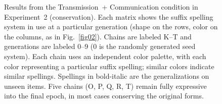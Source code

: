 \documentclass[doc,biblatex]{apa7}
\begin{document}
	\begin{figure}
	\vspace*{2pt}
	\caption{Results from the Transmission~+ Communication condition in Experiment~2 (conservation). Each matrix shows the suffix spelling system in use at a particular generation (shape on the rows, color on the columns, as in Fig.~\ref{fig02}). Chains are labeled K--T and generations are labeled 0--9 (0 is the randomly generated seed system). Each chain uses an independent color palette, with each color representing a particular suffix spelling; similar colors indicate similar spellings. Spellings in bold-italic are the generalizations on unseen items. Five chains (O, P, Q, R, T) remain fully expressive into the final epoch, in most cases conserving the original forms.}
	\label{fig10}
	\end{figure}
\end{document}
